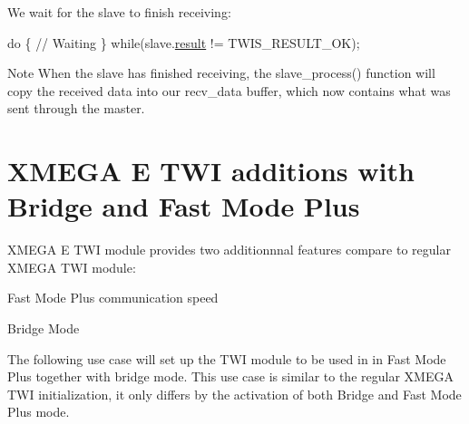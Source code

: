 We wait for the slave to finish receiving\-: 
\begin{DoxyCode}
        \textcolor{keywordflow}{do} \{
            \textcolor{comment}{// Waiting}
        \} \textcolor{keywordflow}{while}(slave.\hyperlink{struct_t_w_i___slave_a38f52b1274d890275ae25f68d289c8d8}{result} != TWIS\_RESULT\_OK);
\end{DoxyCode}
 \begin{DoxyNote}{Note}
When the slave has finished receiving, the slave\-\_\-process() function will copy the received data into our recv\-\_\-data buffer, which now contains what was sent through the master. 
\end{DoxyNote}
\hypertarget{xmega_twi_xmegae}{}\section{X\-M\-E\-G\-A E T\-W\-I additions with Bridge and Fast Mode Plus}\label{xmega_twi_xmegae}
X\-M\-E\-G\-A E T\-W\-I module provides two additionnnal features compare to regular X\-M\-E\-G\-A T\-W\-I module\-:
\begin{DoxyItemize}
\item Fast Mode Plus communication speed
\item Bridge Mode
\end{DoxyItemize}

The following use case will set up the T\-W\-I module to be used in in Fast Mode Plus together with bridge mode. This use case is similar to the regular X\-M\-E\-G\-A T\-W\-I initialization, it only differs by the activation of both Bridge and Fast Mode Plus mode.


